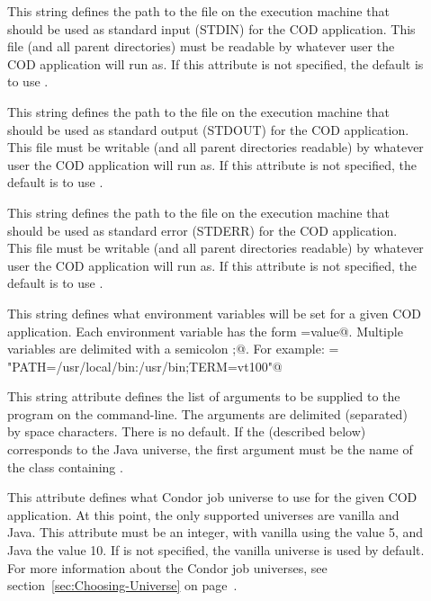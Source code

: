 \begin{description}

 \item[] This string defines the path to the file on the
   execution machine that should be used as standard input (STDIN) for 
   the COD application.
   This file (and all parent directories) must be readable by whatever
   user the COD application will run as.
   If this attribute is not specified, the default is to use
   .
 
 \item[] This string defines the path to the file on the
   execution machine that should be used as standard output (STDOUT)
   for the COD application.
   This file must be writable (and all parent directories readable) by
   whatever user the COD application will run as.
   If this attribute is not specified, the default is to use
   .
 
 \item[] This string defines the path to the file on the
   execution machine that should be used as standard error (STDERR)
   for the COD application.
   This file must be writable (and all parent directories readable) by
   whatever user the COD application will run as.
   If this attribute is not specified, the default is to use
   .

 \item[] This string defines what environment variables will
   be set for a given COD application.
   Each environment variable has the form \verb@NAME=value@.
   Multiple variables are delimited with a semicolon \verb@;@.
   For example: \verb@Env = "PATH=/usr/local/bin:/usr/bin;TERM=vt100"@ 

 \item[] This string attribute defines the list of
   arguments to be supplied to the program on the command-line.
   The arguments are delimited (separated) by space characters. 
   There is no default. 
   If the  (described below) corresponds to the Java
   universe, the first argument must be the name of the class
   containing .

 \item[] This attribute defines what Condor job
   universe to use for the given COD application.
   At this point, the only supported universes are vanilla and Java.
   This attribute must be an integer, with vanilla using the value 5,
   and Java the value 10.
   If  is not specified, the vanilla universe is
   used by default.
   For more information about the Condor job universes, see
   section~\ref{sec:Choosing-Universe} on
   page~\pageref{sec:Choosing-Universe}. 


\end{description}
